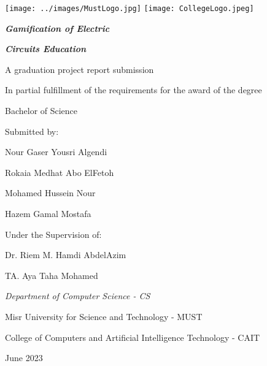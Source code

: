 \documentclass[../main.tex]{subfiles}
\begin{document}
\centering
\texttt{[image: ../images/MustLogo.jpg]}
\hspace{6cm}
\texttt{[image: CollegeLogo.jpeg]}
\vspace{2cm}

\textit{\textbf{\LARGE Gamification of Electric}}

\textit{\textbf{\LARGE Circuits Education}}

\vspace{2cm}
A graduation project report submission

In partial fulfillment of the requirements for the award of the degree

Bachelor of Science

\vspace{2cm}
\large
Submitted by:

\vspace{1cm}
Nour Gaser Yousri Algendi

Rokaia Medhat Abo ElFetoh

Mohamed Hussein Nour

Hazem Gamal Mostafa
 
\vspace{1.5cm}
Under the Supervision of:

Dr. Riem M. Hamdi AbdelAzim

TA. Aya Taha Mohamed


\vspace{2cm}
\normalsize
\textit{Department of Computer Science - CS}

Misr University for Science and Technology - MUST

College of Computers and Artificial Intelligence Technology - CAIT

June 2023
\end{document}
